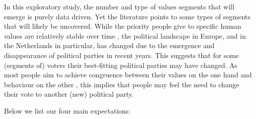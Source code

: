 \documentclass[12pt,letter]{article}\usepackage[]{graphicx}\usepackage[]{xcolor}
\begin{document}
In this exploratory study, the number and type of values segments that will emerge is purely data driven. Yet the literature points to some types of segments that will likely be uncovered. While the priority people give to specific human values are relatively stable over time \citep{schwartz2006}, the political landscape in Europe, and in the Netherlands in particular, has changed due to the emergence and disappearance of political parties in recent years. This suggests that for some (segments of) voters their best-fitting political parties may have changed. As most people aim to achieve congruence between their values on the one hand and behaviour on the other \citep{edwards2009}, this implies that people may feel the need to change their vote to another (new) political party. 

Below we list our four main expectations:
\end{document}
